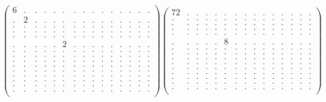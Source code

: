 \documentclass[12pt,a4paper]{amsart}
\begin{document}
\begin{align*}
\left(\begin{array}{rrrrrrrrrrrrrrr}%
6&.&.&.&.&.&.&.&.&.&.&.&.&.&.\\%
.&2&.&.&.&.&.&.&.&.&.&.&.&.&.\\%
.&.&.&.&.&.&.&.&.&.&.&.&.&.&.\\%
.&.&.&.&.&.&.&.&.&.&.&.&.&.&.\\%
.&.&.&.&.&.&.&.&.&.&.&.&.&.&.\\%
.&.&.&.&.&2&.&.&.&.&.&.&.&.&.\\%
.&.&.&.&.&.&.&.&.&.&.&.&.&.&.\\%
.&.&.&.&.&.&.&.&.&.&.&.&.&.&.\\%
.&.&.&.&.&.&.&.&.&.&.&.&.&.&.\\%
.&.&.&.&.&.&.&.&.&.&.&.&.&.&.\\%
.&.&.&.&.&.&.&.&.&.&.&.&.&.&.\\%
.&.&.&.&.&.&.&.&.&.&.&.&.&.&.\\%
.&.&.&.&.&.&.&.&.&.&.&.&.&.&.\\%
.&.&.&.&.&.&.&.&.&.&.&.&.&.&.\\%
.&.&.&.&.&.&.&.&.&.&.&.&.&.&.\\%
\end{array}\right)%
\left(\begin{array}{rrrrrrrrrrrrrrr}%
72&.&.&.&.&.&.&.&.&.&.&.&.&.&.\\%
.&.&.&.&.&.&.&.&.&.&.&.&.&.&.\\%
.&.&.&.&.&.&.&.&.&.&.&.&.&.&.\\%
.&.&.&.&.&.&.&.&.&.&.&.&.&.&.\\%
.&.&.&.&.&.&.&.&.&.&.&.&.&.&.\\%
.&.&.&.&.&8&.&.&.&.&.&.&.&.&.\\%
.&.&.&.&.&.&.&.&.&.&.&.&.&.&.\\%
.&.&.&.&.&.&.&.&.&.&.&.&.&.&.\\%
.&.&.&.&.&.&.&.&.&.&.&.&.&.&.\\%
.&.&.&.&.&.&.&.&.&.&.&.&.&.&.\\%
.&.&.&.&.&.&.&.&.&.&.&.&.&.&.\\%
.&.&.&.&.&.&.&.&.&.&.&.&.&.&.\\%
.&.&.&.&.&.&.&.&.&.&.&.&.&.&.\\%
.&.&.&.&.&.&.&.&.&.&.&.&.&.&.\\%
.&.&.&.&.&.&.&.&.&.&.&.&.&.&.\\%
\end{array}\right)%
\end{align*}
\end{document}
